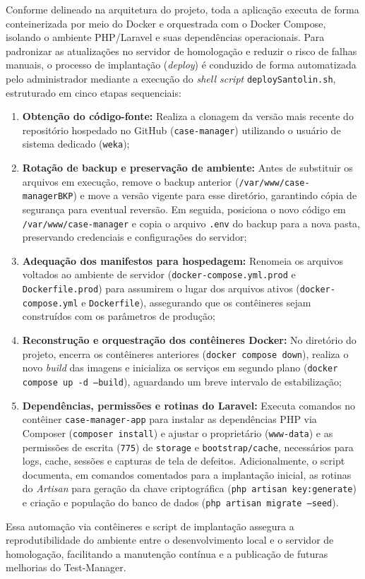 Conforme delineado na arquitetura do projeto, toda a aplicação executa de forma conteinerizada por meio do Docker e orquestrada com o Docker Compose, isolando o ambiente PHP/Laravel e suas dependências operacionais. Para padronizar as atualizações no servidor de homologação e reduzir o risco de falhas manuais, o processo de implantação (\textit{deploy}) é conduzido de forma automatizada pelo administrador mediante a execução do \textit{shell script} \texttt{deploySantolin.sh}, estruturado em cinco etapas sequenciais:
\begin{enumerate}
    \item \textbf{Obtenção do código-fonte:} Realiza a clonagem da versão mais recente do repositório hospedado no GitHub (\texttt{case-manager}) utilizando o usuário de sistema dedicado (\texttt{weka});
    \item \textbf{Rotação de backup e preservação de ambiente:} Antes de substituir os arquivos em execução, remove o backup anterior (\texttt{/var/www/case-managerBKP}) e move a versão vigente para esse diretório, garantindo cópia de segurança para eventual reversão. Em seguida, posiciona o novo código em \texttt{/var/www/case-manager} e copia o arquivo \texttt{.env} do backup para a nova pasta, preservando credenciais e configurações do servidor;
    \item \textbf{Adequação dos manifestos para hospedagem:} Renomeia os arquivos voltados ao ambiente de servidor (\texttt{docker-compose.yml.prod} e \texttt{Dockerfile.prod}) para assumirem o lugar dos arquivos ativos (\texttt{docker-compose.yml} e \texttt{Dockerfile}), assegurando que os contêineres sejam construídos com os parâmetros de produção;
    \item \textbf{Reconstrução e orquestração dos contêineres Docker:} No diretório do projeto, encerra os contêineres anteriores (\texttt{docker compose down}), realiza o novo \textit{build} das imagens e inicializa os serviços em segundo plano (\texttt{docker compose up -d --build}), aguardando um breve intervalo de estabilização;
    \item \textbf{Dependências, permissões e rotinas do Laravel:} Executa comandos no contêiner \texttt{case-manager-app} para instalar as dependências PHP via Composer (\texttt{composer install}) e ajustar o proprietário (\texttt{www-data}) e as permissões de escrita (\texttt{775}) de \texttt{storage} e \texttt{bootstrap/cache}, necessários para logs, cache, sessões e capturas de tela de defeitos. Adicionalmente, o script documenta, em comandos comentados para a implantação inicial, as rotinas do \textit{Artisan} para geração da chave criptográfica (\texttt{php artisan key:generate}) e criação e população do banco de dados (\texttt{php artisan migrate --seed}).
\end{enumerate}

Essa automação via contêineres e script de implantação assegura a reprodutibilidade do ambiente entre o desenvolvimento local e o servidor de homologação, facilitando a manutenção contínua e a publicação de futuras melhorias do Test-Manager.